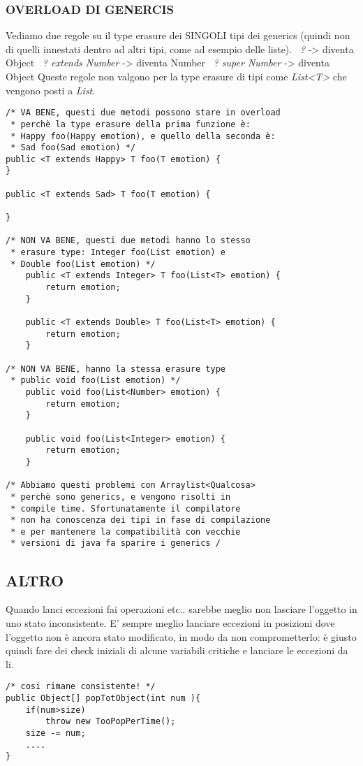 \noindent \subsubsection{OVERLOAD DI GENERCIS}
\noindent Vediamo due regole su il type erasure dei SINGOLI tipi dei generics (quindi non di quelli innestati dentro ad altri tipi, come ad esempio delle liste). \newline
\textbullet\ \textit{?} -> diventa Object \newline
\textbullet\ \textit{? extends Number} -> diventa Number \newline
\textbullet\ \textit{? super Number} -> diventa Object \newline
Queste regole non valgono per la type erasure di tipi come \textit{List<T>} che vengono posti a \textit{List}.
\begin{lstlisting}
/* VA BENE, questi due metodi possono stare in overload
 * perchè la type erasure della prima funzione è:
 * Happy foo(Happy emotion), e quello della seconda è:
 * Sad foo(Sad emotion) */
public <T extends Happy> T foo(T emotion) {
}   

public <T extends Sad> T foo(T emotion) {

} 

/* NON VA BENE, questi due metodi hanno lo stesso
 * erasure type: Integer foo(List emotion) e
 * Double foo(List emotion) */
	public <T extends Integer> T foo(List<T> emotion) {
		return emotion;
	}   
	
	public <T extends Double> T foo(List<T> emotion) {
		return emotion;
	} 
	
/* NON VA BENE, hanno la stessa erasure type
 * public void foo(List emotion) */
	public void foo(List<Number> emotion) {
		return emotion;
	}   
	
	public void foo(List<Integer> emotion) {
		return emotion;
	} 
	
/* Abbiamo questi problemi con Arraylist<Qualcosa>
 * perchè sono generics, e vengono risolti in
 * compile time. Sfortunatamente il compilatore
 * non ha conoscenza dei tipi in fase di compilazione
 * e per mantenere la compatibilità con vecchie 
 * versioni di java fa sparire i generics /	
\end{lstlisting}


\subsection{ALTRO}
\noindent Quando lanci eccezioni fai operazioni etc.. sarebbe meglio non lasciare l'oggetto in uno stato inconsistente. E' sempre meglio lanciare eccezioni in posizioni dove l'oggetto non è ancora stato modificato, in modo da non comprometterlo: è giusto quindi fare dei check iniziali di alcune variabili critiche e lanciare le eccezioni da li. 
\begin{lstlisting}
/* cosi rimane consistente! */
public Object[] popTotObject(int num ){
	if(num>size)
		throw new TooPopPerTime();
	size -= num;
	....
}
\end{lstlisting}